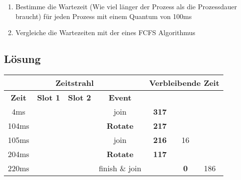 \documentclass{article}
\begin{document}
\begin{enumerate}
    \item Bestimme die Wartezeit (Wie viel länger der Prozess als die Prozessdauer braucht) für jeden Prozess mit einem Quantum von 100ms
    \item Vergleiche die Wartezeiten mit der eines FCFS Algorithmus
\end{enumerate}

\subsection{Lösung}

\begin{table}[!h]
    \centering
    \begin{tabular}{c|cc|c|ccc}
        \multicolumn{4}{c}{\textbf{Zeitstrahl}} & \multicolumn{3}{|c}{\textbf{Verbleibende Zeit}}                                                                                                                                  \\ \hline
        \textbf{Zeit}                           & \textbf{Slot 1}                                 & \textbf{Slot 2} & \textbf{Event}                 & \multicolumn{1}{l}{\textbf{\PZero{}}} & \textbf{\POne{}} & \textbf{\PTwo{}} \\ \hline
        4ms                                     & \PZero{}                                        &                 & \PZero{} join                  & \textbf{317}                          &                  &                  \\
        104ms                                   & \PZero{}                                        &                 & \textbf{Rotate}                & \textbf{217}                          &                  &                  \\
        105ms                                   & \PZero{}                                        & \POne{}         & \POne{} join                   & \textbf{216}                          & 16               &                  \\
        204ms                                   & \POne{}                                         & \PZero{}        & \textbf{Rotate}                & \textbf{117}                          &                  &                  \\
        220ms                                   & \PZero{}                                        & \PTwo{}         & \POne{} finish \& \PTwo{} join &                                       & \textbf{0}       & 186              \\

\end{tabular}
\end{table}
\end{document}
